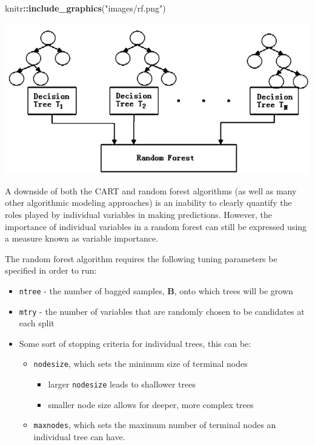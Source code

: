 \documentclass[
]{book}
\newenvironment{Shaded}{\begin{snugshade}}{\end{snugshade}}
\newcommand{\FunctionTok}[1]{\textcolor[rgb]{0.13,0.29,0.53}{\textbf{#1}}}
\newcommand{\NormalTok}[1]{#1}
\newcommand{\SpecialCharTok}[1]{\textcolor[rgb]{0.81,0.36,0.00}{\textbf{#1}}}
\newcommand{\StringTok}[1]{\textcolor[rgb]{0.31,0.60,0.02}{#1}}
\providecommand{\tightlist}{%
  \setlength{\itemsep}{0pt}\setlength{\parskip}{0pt}}
\begin{document}
\begin{Shaded}
\begin{Highlighting}[]
\NormalTok{knitr}\SpecialCharTok{::}\FunctionTok{include\_graphics}\NormalTok{(}\StringTok{"images/rf.png"}\NormalTok{)}
\end{Highlighting}
\end{Shaded}

\includegraphics[width=0.8\linewidth]{images/rf}

A downside of both the CART and random forest algorithms (as well as many other algorithmic modeling approaches) is an inability to clearly quantify the roles played by individual variables in making predictions. However, the importance of individual variables in a random forest can still be expressed using a measure known as variable importance.

The random forest algorithm requires the following tuning parameters be specified in order to run:

\begin{itemize}
\tightlist
\item
  \texttt{ntree} - the number of bagged samples, \(\boldsymbol{B}\), onto which trees will be grown
\item
  \texttt{mtry} - the number of variables that are randomly chosen to be candidates at each split
\item
  Some sort of stopping criteria for individual trees, this can be:

  \begin{itemize}
  \tightlist
  \item
    \texttt{nodesize}, which sets the minimum size of terminal nodes

    \begin{itemize}
    \tightlist
    \item
      larger \texttt{nodesize} leads to shallower trees
    \item
      smaller node size allows for deeper, more complex trees
    \end{itemize}
  \item
    \texttt{maxnodes}, which sets the maximum number of terminal nodes an individual tree can have.
  \end{itemize}
\end{itemize}
\end{document}
